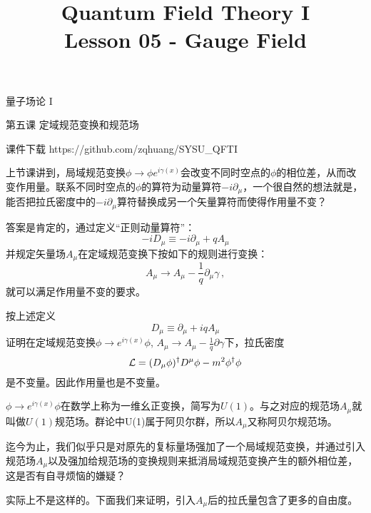 \documentclass[CJK]{beamer}
\title{Quantum Field Theory I \\ Lesson 05 - Gauge Field}
\author{}
\date{}
\begin{document}
\begin{frame}
 
\begin{center}
\begin{Large}
\bch
量子场论 I 

{\vskip 0.3in}

第五课 定域规范变换和规范场

\ech
\end{Large}
\end{center}

\vskip 0.2in

\bch
课件下载
\ech
https://github.com/zqhuang/SYSU\_QFTI

\end{frame}



\begin{frame}
\bch
上节课讲到，局域规范变换$\phi \rightarrow \phi e^{i\gamma(x)}$会改变不同时空点的$\phi$的相位差，从而改变作用量。联系不同时空点的$\phi$的算符为动量算符$-i\partial_\mu$，一个很自然的想法就是，能否把拉氏密度中的$-i\partial_\mu$算符替换成另一个矢量算符而使得作用量不变？

\skipline
答案是肯定的，通过定义“正则动量算符”：
$$-iD_\mu \equiv -i\partial_\mu + q A_\mu$$
并规定矢量场$A_\mu$在定域规范变换下按如下的规则进行变换：
$$ A_\mu \rightarrow A_\mu - \frac{1}{q} \partial_\mu \gamma\, ,$$
就可以满足作用量不变的要求。

\ech
\end{frame}

\begin{frame}
\bch
按上述定义
$$D_\mu \equiv \partial_\mu + iq A_\mu$$
证明在定域规范变换$\phi \rightarrow e^{i\gamma(x)}\phi$, $A_\mu \rightarrow A_\mu - \frac{1}{q}\partial\gamma$下，拉氏密度
$${\mathcal{L}} = (D_\mu\phi)^\dagger D^\mu\phi - m^2\phi^\dagger \phi$$
是不变量。因此作用量也是不变量。

\skipline
$\phi \rightarrow e^{i\gamma(x)}\phi$在数学上称为一维幺正变换，简写为$U(1)$。与之对应的规范场$A_\mu$就叫做$U(1)$规范场。群论中U(1)属于阿贝尔群，所以$A_\mu$又称阿贝尔规范场。
\ech
\end{frame}

\begin{frame}
\bch

迄今为止，我们似乎只是对原先的复标量场强加了一个局域规范变换，并通过引入规范场$A_\mu$以及强加给规范场的变换规则来抵消局域规范变换产生的额外相位差，这是否有自寻烦恼的嫌疑？

\skipline
实际上不是这样的。下面我们来证明，引入$A_\mu$后的拉氏量包含了更多的自由度。

\ech
\end{frame}
\end{document}

